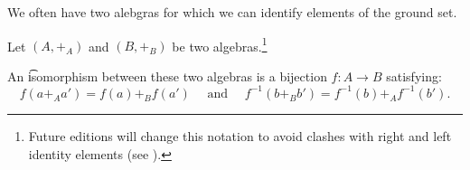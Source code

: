 

We often have two alebgras for which we can identify elements of the ground set.


Let $(A, +_{A})$ and $(B, +_B)$ be two algebras.\footnote{Future editions will change this notation to avoid clashes with right and left identity elements (see ).}

An \t{isomorphism} between these two algebras is a bijection $f: A \to B$ satisfying:
\[
  f(a +_A a') =  f(a) +_B f(a') \quad \text{ and } \quad f^{-1}(b +_B b') = f^{-1}(b) +_A f^{-1}(b').
\]

\blankpage
